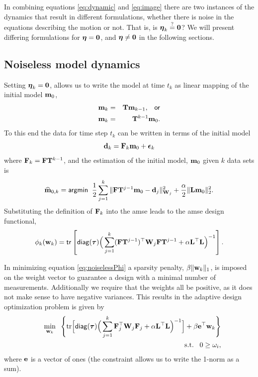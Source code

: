 \documentclass[11pt]{article}
\newcommand{\bfF}	{{\bf{F}}}
\newcommand{\bfL}	{{\bf{L}}}
\newcommand{\bfT}	{{\bf{T}}}
\newcommand{\bfW}	{{\bf{W}}}
\newcommand{\bfd}	{{\bf{d}}}
\newcommand{\bfe}	{{\bf{e}}}
\newcommand{\bfm}	{{\bf{m}}}
\newcommand{\bfw}	{{\bf{w}}}
\newcommand{\hf}        {{\frac 12}}
\newcommand{\bfepsilon} {{\boldsymbol \epsilon}}
\newcommand{\bfeta}     {{\boldsymbol \eta}}
\newcommand{\bftau}      {{\boldsymbol \tau}}
\newcommand{\bfmhat}    {{\widehat{\bfm}}}
\newcommand{\LtL}       { \bfL^{\top}\bfL}
\newcommand {\zero}  { {\bf 0} }
\renewcommand{\hf}		 {\frac12}
\renewcommand{\bfmhat}	{\widehat{\bf m}}
\begin{document}
{In combining equations \eqref{eq:dynamic} and \eqref{eq:image}  there are two instances of the dynamics that result in different formulations, whether there is noise in the equations describing the motion or not. That is, is $\bfeta_k \overset{?}{=} \zero$? We will present differing formulations  for $\bfeta = \zero$, and $\bfeta \neq \zero$ in the following sections.

\subsection{Noiseless model dynamics}
Setting $\bfeta_k = \zero$, allows us to write the model at time $t_k$ as linear mapping of the initial model $\bfm_0$, 
\begin{eqnarray*}
\bfm_{k} &=& \bfT\bfm_{k-1}, \;\;\;{\sf or } \\
\bfm_{k} &=& \bfT^{k-1}\bfm_0.
\end{eqnarray*} 
To this end the data for time step $t_k$ can be written in terms of the initial model 
\begin{equation}
\bfd_k = \bfF_k\bfm_0 + \bfepsilon_k
\end{equation}
where $\bfF_k = \bfF\bfT^{k-1}$, and the estimation of the initial model, $\bfm_0$ given $k$ data sets is 
\begin{equation}
\bfmhat_{0,k} ={\sf argmin } \;\; \hf  \sum_{j=1}^{k}\| \bfF\bfT^{j-1}\bfm_0 - \bfd_j \|_{\bfW_j}^2 + \frac{\alpha}{2}\|\bfL\bfm_0\|_2^2.
\end{equation}
Substituting the definition of $\bfF_k$ into the {\sf amse} leads to the {\sf amse} design functional,
\begin{equation}
\label{eq:noiselessPhi}
\phi_{k}(\bfw_{k}) = {\sf tr} \left[  {\sf diag}(\bftau) \Big(\sum_{j=1}^{k}(\bfF\bfT^{j-1})^{\top}\bfW_{j}\bfF\bfT^{j-1}   +
\alpha \LtL \Big)^{-1} \right] .
\end{equation}

In minimizing equation \eqref{eq:noiselessPhi} a sparsity penalty, $\beta\|\bfw_k\|_1$, is imposed on the weight vector to guarantee a design with a minimal number of measurements. Additionally we require that the weights all be positive, as it does not make sense to have negative variances. This results in the adaptive design optimization problem is given by 
\begin{eqnarray}
\label{eq:noiselessOpt}
\nonumber
 &&\min_{\bfw_k}\;\;\Bigg \{\text{tr}\Big[ {\sf diag}(\bftau) \Big(\sum_{j=1}^{k}\bfF_{j}^{\top}\bfW_{j}\bfF_{j}   +
\alpha \LtL\Big)^{-1}\Big] + \beta \bfe^{\top}\bfw_k \Bigg \}\\
 &&\text{ s.t.} \;\;\;0 \geq \omega_i,
\end{eqnarray}
where $\bfe$ is a vector of ones (the constraint allows us to write the 1-norm as a sum). 

}
\end{document}
